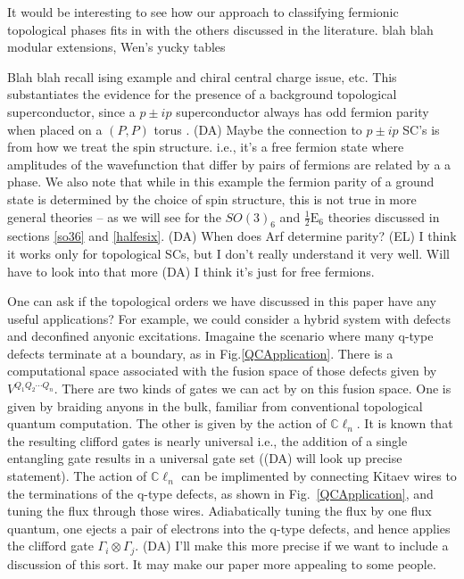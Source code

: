 \documentclass[12pt,a4paper]{article}
\newcommand{\tp}{\otimes}
\newcommand{\cl}{\mathbb{C}\ell}
\newcommand{\dave}[1]{{\color{ao(english)}\footnotesize{(DA) #1}}}
\newcommand{\ethan}[1]{{\color{amethyst}\footnotesize{(EL) #1}}}
\newcommand{\halfesix}{\frac{1}{2}\text{E}_6}
\begin{document}
It would be interesting to see how our approach to classifying fermionic topological phases fits in 
with the others discussed in the literature. 
blah blah modular extensions, Wen's yucky tables

Blah blah recall ising example and chiral central charge issue, etc. 
This substantiates the evidence for the presence of a background topological superconductor, 
since a $p\pm ip$ superconductor always has odd fermion parity when placed 
on a $(P,P)$ torus \cite{ware2016,you2015}.
\dave{Maybe the connection to $p\pm ip$ SC's is from how we treat the spin structure. 
i.e., it's a free fermion state where amplitudes of the wavefunction that differ by pairs of 
fermions are related by a a phase. 
}
We also note that while in this example the fermion parity of a ground state is determined by 
the choice of spin structure, this is not true in more general theories -- as we will see 
for the $SO(3)_6$ and $\halfesix$ theories discussed in sections \ref{so36} and \ref{halfesix}.
\dave{When does Arf determine parity?}
\ethan{I think it works only for topological SCs, but I don't really understand it very well. Will have to look into that more}
\dave{I think it's just for free fermions.}

One can ask if the topological orders we have discussed in this paper have any useful applications?
For example, we could consider a hybrid system with defects and deconfined anyonic excitations.
Imagaine the scenario where many q-type defects terminate at a boundary, as in Fig.\ref{QCApplication}. 
There is a computational space associated with the fusion space of those defects given by $V^{Q_1 Q_2 \cdots Q_n}$. 
There are two kinds of gates we can act by on this fusion space.
One is given by braiding anyons in the bulk, familiar from conventional topological quantum computation.
The other is given by the action of $\cl_n$.
It is known that the resulting clifford gates is nearly universal i.e., the addition of a single entangling gate results in a universal gate set (\dave{will look up precise statement}).
The action of $\cl_n$ can be implimented by connecting Kitaev wires to the terminations of the q-type defects, as shown in Fig.~\ref{QCApplication}, and tuning the flux through those wires. 
Adiabatically tuning the flux by one flux quantum, one ejects a pair of electrons into the q-type defects, and hence applies the clifford gate $\Gamma_i \tp \Gamma_j$.
\dave{I'll make this more precise if we want to include a discussion of this sort.
It may make our paper more appealing to some people.}
\end{document}
